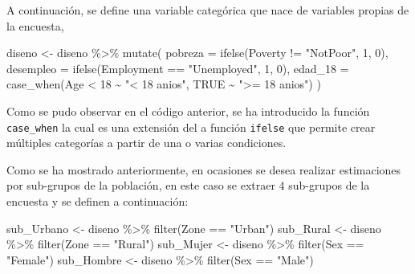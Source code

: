 \documentclass[
  12pt,
]{book}
\newenvironment{Shaded}{\begin{snugshade}}{\end{snugshade}}
\newcommand{\AttributeTok}[1]{\textcolor[rgb]{0.77,0.63,0.00}{#1}}
\newcommand{\ConstantTok}[1]{\textcolor[rgb]{0.00,0.00,0.00}{#1}}
\newcommand{\DecValTok}[1]{\textcolor[rgb]{0.00,0.00,0.81}{#1}}
\newcommand{\FunctionTok}[1]{\textcolor[rgb]{0.00,0.00,0.00}{#1}}
\newcommand{\NormalTok}[1]{#1}
\newcommand{\OtherTok}[1]{\textcolor[rgb]{0.56,0.35,0.01}{#1}}
\newcommand{\SpecialCharTok}[1]{\textcolor[rgb]{0.00,0.00,0.00}{#1}}
\newcommand{\StringTok}[1]{\textcolor[rgb]{0.31,0.60,0.02}{#1}}
\begin{document}
A continuación, se define una variable categórica que nace de variables propias de la encuesta,

\begin{Shaded}
\begin{Highlighting}[]
\NormalTok{diseno }\OtherTok{\textless{}{-}}\NormalTok{ diseno }\SpecialCharTok{\%\textgreater{}\%} \FunctionTok{mutate}\NormalTok{(}
                     \AttributeTok{pobreza =} \FunctionTok{ifelse}\NormalTok{(Poverty }\SpecialCharTok{!=} \StringTok{"NotPoor"}\NormalTok{, }\DecValTok{1}\NormalTok{, }\DecValTok{0}\NormalTok{),}
                     \AttributeTok{desempleo =} \FunctionTok{ifelse}\NormalTok{(Employment }\SpecialCharTok{==} \StringTok{"Unemployed"}\NormalTok{, }\DecValTok{1}\NormalTok{, }\DecValTok{0}\NormalTok{),}
                     \AttributeTok{edad\_18 =} \FunctionTok{case\_when}\NormalTok{(Age }\SpecialCharTok{\textless{}} \DecValTok{18} \SpecialCharTok{\textasciitilde{}} \StringTok{"\textless{} 18 anios"}\NormalTok{, }\ConstantTok{TRUE} \SpecialCharTok{\textasciitilde{}} \StringTok{"\textgreater{}= 18 anios"}\NormalTok{)}
\NormalTok{)}
\end{Highlighting}
\end{Shaded}

Como se pudo observar en el código anterior, se ha introducido la función \texttt{case\_when} la cual es una extensión del a función \texttt{ifelse} que permite crear múltiples categorías a partir de una o varias condiciones.

Como se ha mostrado anteriormente, en ocasiones se desea realizar estimaciones por sub-grupos de la población, en este caso se extraer 4 sub-grupos de la encuesta y se definen a continuación:

\begin{Shaded}
\begin{Highlighting}[]
\NormalTok{sub\_Urbano }\OtherTok{\textless{}{-}}\NormalTok{ diseno }\SpecialCharTok{\%\textgreater{}\%}  \FunctionTok{filter}\NormalTok{(Zone }\SpecialCharTok{==} \StringTok{"Urban"}\NormalTok{)}
\NormalTok{sub\_Rural  }\OtherTok{\textless{}{-}}\NormalTok{ diseno }\SpecialCharTok{\%\textgreater{}\%}  \FunctionTok{filter}\NormalTok{(Zone }\SpecialCharTok{==} \StringTok{"Rural"}\NormalTok{)}
\NormalTok{sub\_Mujer  }\OtherTok{\textless{}{-}}\NormalTok{ diseno }\SpecialCharTok{\%\textgreater{}\%}  \FunctionTok{filter}\NormalTok{(Sex }\SpecialCharTok{==} \StringTok{"Female"}\NormalTok{)}
\NormalTok{sub\_Hombre }\OtherTok{\textless{}{-}}\NormalTok{ diseno }\SpecialCharTok{\%\textgreater{}\%}  \FunctionTok{filter}\NormalTok{(Sex }\SpecialCharTok{==} \StringTok{"Male"}\NormalTok{)}
\end{Highlighting}
\end{Shaded}
\end{document}
